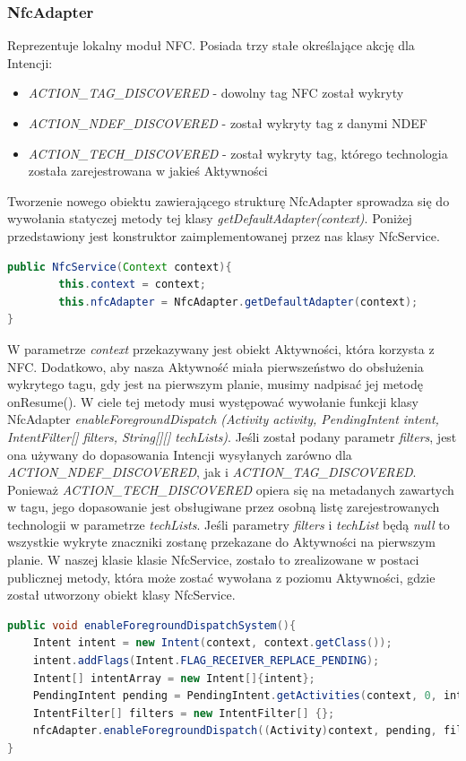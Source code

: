 \subsubsection{NfcAdapter}
Reprezentuje lokalny moduł NFC. Posiada trzy stałe określające akcję dla Intencji:
\begin{itemize}
    \item \textit{ACTION\_TAG\_DISCOVERED} - dowolny tag NFC został wykryty
    \item \textit{ACTION\_NDEF\_DISCOVERED} - został wykryty tag z danymi NDEF
    \item \textit{ACTION\_TECH\_DISCOVERED} - został wykryty tag, którego technologia została zarejestrowana w jakieś Aktywności
\end{itemize}
Tworzenie nowego obiektu zawierającego strukturę NfcAdapter sprowadza się do wywołania statyczej metody tej klasy \textit{getDefaultAdapter(context)}. Poniżej przedstawiony jest konstruktor zaimplementowanej przez nas klasy NfcService. 
\begin{lstlisting}[language=Java]
public NfcService(Context context){
        this.context = context;
        this.nfcAdapter = NfcAdapter.getDefaultAdapter(context);
}
\end{lstlisting}
W parametrze \textit{context} przekazywany jest obiekt Aktywności, która korzysta z NFC. Dodatkowo, aby nasza Aktywność miała pierwszeństwo do obsłużenia wykrytego tagu, gdy jest na pierwszym planie, musimy nadpisać jej metodę onResume(). W ciele tej metody musi występować wywołanie funkcji klasy NfcAdapter \textit{enableForegroundDispatch (Activity activity, PendingIntent intent, IntentFilter[] filters, String[][] techLists)}. Jeśli został podany parametr \textit{filters}, jest ona używany do dopasowania Intencji wysyłanych zarówno dla \textit{ACTION\_NDEF\_DISCOVERED}, jak i \textit{ACTION\_TAG\_DISCOVERED}. Ponieważ \textit{ACTION\_TECH\_DISCOVERED} opiera się na metadanych zawartych w tagu, jego dopasowanie jest obsługiwane przez osobną listę zarejestrowanych technologii w parametrze \textit{techLists}. Jeśli parametry \textit{filters} i \textit{techList} będą \textit{null} to wszystkie wykryte znaczniki zostanę przekazane do Aktywności na pierwszym planie. W naszej klasie klasie NfcService, zostało to zrealizowane w postaci publicznej metody, która może zostać wywołana z poziomu Aktywności, gdzie został utworzony obiekt klasy NfcService.
\begin{lstlisting}[language=Java]
public void enableForegroundDispatchSystem(){
    Intent intent = new Intent(context, context.getClass());
    intent.addFlags(Intent.FLAG_RECEIVER_REPLACE_PENDING);
    Intent[] intentArray = new Intent[]{intent};
    PendingIntent pending = PendingIntent.getActivities(context, 0, intentArray, 0);
    IntentFilter[] filters = new IntentFilter[] {};
    nfcAdapter.enableForegroundDispatch((Activity)context, pending, filters, null);
}
\end{lstlisting}
